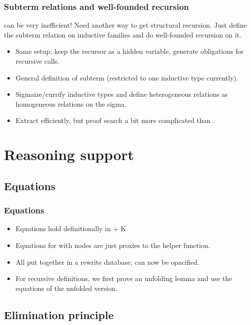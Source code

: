 \begin{frame}
  \frametitle{Subterm relations and well-founded recursion}

  \Below can be very inefficient! Need another way to get structural
  recursion. Just define the subterm relation on inductive families and
  do well-founded recursion on it.
  
  \begin{itemize}
  \item Same setup, keep the recursor as a hidden
    variable, generate obligations for recursive calls.
  \item General definition of subterm (restricted to one inductive type
    currently).
  \item Sigmaize/currify inductive types and define heterogeneous
    relations as homogeneous relations on the sigma. 
  \item Extract efficiently, but proof search a bit more complicated
    than \Below.
  \end{itemize}
\end{frame}  
\begin{frame}
\end{frame}

\section{Reasoning support}

\subsection{Equations}
\begin{frame}
  \frametitle{Equations}
  
  \begin{itemize}
  \item Equations hold definitionally in \CCI + K
  \item Equations for with nodes are just proxies to the helper function.
  \item All put together in a rewrite database,  can now
    be opacified.
  \item For recursive definitions, we first prove an unfolding lemma and use
    the equations of the unfolded version. 
  \end{itemize}
\end{frame}

\subsection{Elimination principle}

